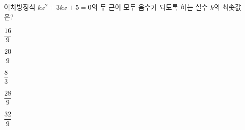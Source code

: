 이차방정식 $kx^2+3kx+5=0$의 두 근이 모두 음수가 되도록 하는 실수 $k$의 최솟값은?
\begin{choices32}{\rule[-3ex]{0pt}{8ex}$\dfrac{16}{9}$}{\rule[-3ex]{0pt}{8ex}$\dfrac{20}{9}$}{\rule[-3ex]{0pt}{8ex}$\dfrac{8}{3}$}{\rule[-3ex]{0pt}{8ex}$\dfrac{28}{9}$}{\rule[-3ex]{0pt}{8ex}$\dfrac{32}{9}$}\end{choices32}
